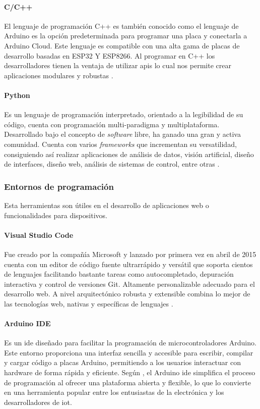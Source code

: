 \paragraph{C/C++}
El lenguaje de programación C++ es también conocido como el lenguaje de Arduino es la opción predeterminada para programar una placa y conectarla a Arduino Cloud. Este lenguaje es compatible con una alta gama  de placas de desarrollo basadas en ESP32 Y ESP8266.
Al programar en C++ los desarrolladores tienen la ventaja de utilizar \acrshort{api}s lo cual nos permite crear aplicaciones modulares y robustas \citep{arduino_docs}.

\paragraph{Python}
Es un lenguaje de programación interpretado, orientado a la legibilidad de su código, cuenta con programación multi-paradigma y multiplataforma. Desarrollado bajo el concepto de \textit{software} libre, ha ganado una gran y activa comunidad. Cuenta con varios \textit{frameworks} que incrementan su versatilidad, consiguiendo así realizar aplicaciones de análisis de datos, visión artificial, diseño de interfaces, diseño web, análisis de sistemas de control, entre otras \citep{python}.

\subsubsection{Entornos de programación}
Esta herramientas son útiles en el desarrollo de aplicaciones web o funcionalidades para dispositivos.
\paragraph{Visual Studio Code}
Fue creado por la compañía Microsoft y lanzado por primera vez en abril de 2015 cuenta con un editor de código fuente ultrarrápido y versátil que soporta cientos de lenguajes facilitando bastante tareas como autocompletado, depuración interactiva y control de versiones Git. Altamente personalizable adecuado para el desarrollo web. A nivel arquitectónico robusta y extensible combina lo mejor de las tecnologías web, nativas y específicas de lenguajes \citep{vscode_why}.

\paragraph{Arduino IDE}
Es un \acrfull{ide} diseñado para facilitar la programación de microcontroladores Arduino. Este entorno proporciona una interfaz sencilla y accesible para escribir, compilar y cargar código a placas Arduino, permitiendo a los usuarios interactuar con hardware de forma rápida y eficiente. Según \cite{banzi2014arduino}, el Arduino \acrshort{ide} simplifica el proceso de programación al ofrecer una plataforma abierta y flexible, lo que lo convierte en una herramienta popular entre los entusiastas de la electrónica y los desarrolladores de \acrshort{iot}.

